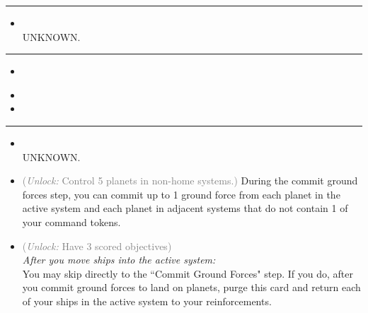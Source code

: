 \begin{multicols}{2}
\vspace{-10pt}\rule{\hsize}{0.4pt}\vspace{5pt}


\begin{itemize}
\item {} %
\\
UNKNOWN.
\end{itemize}

\vspace{-10pt}\rule{\hsize}{0.4pt}\vspace{5pt}


\begin{itemize}
\item \exoI
\end{itemize}

\columnbreak
{}

\begin{itemize}
\item \exoII
\item \valkyrie
\end{itemize}

\vspace{-10pt}\rule{\hsize}{0.4pt}\vspace{5pt}


\begin{itemize}
\item {}\\
UNKNOWN.
\item {} \textcolor{gray}{(\emph{Unlock:} Control 5 planets in non-home systems.)}
During the commit ground forces step, you can commit up to 1 ground force from each planet in the active system and each planet in adjacent systems that do not contain 1 of your command tokens.
\item {} \textcolor{gray}{(\emph{Unlock:} Have 3 scored objectives)}\\
\emph{After you move ships into the active system:}\\
You may skip directly to the ``Commit Ground Forces" step. If you do, after you commit ground forces to land on planets, purge this card and return each of your ships in the active system to your reinforcements.
\end{itemize}


\end{multicols}
